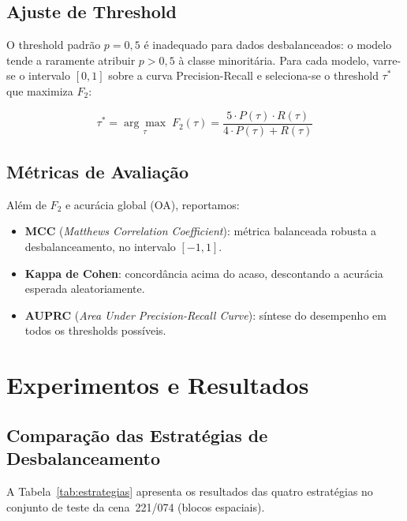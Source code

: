 \documentclass[conference]{IEEEtran}
\begin{document}
\subsection{Ajuste de Threshold}

O threshold padrão $p=0{,}5$ é inadequado para dados desbalanceados:
o modelo tende a raramente atribuir $p>0{,}5$ à classe minoritária.
Para cada modelo, varre-se o intervalo $[0,1]$ sobre a curva
Precision-Recall e seleciona-se o threshold $\tau^*$ que maximiza
$F_2$:

\begin{equation}
  \tau^* = \underset{\tau}{\arg\max}\;
  F_2(\tau) = \frac{5 \cdot P(\tau) \cdot R(\tau)}
                   {4 \cdot P(\tau) + R(\tau)}
  \label{eq:f2}
\end{equation}

\subsection{Métricas de Avaliação}

Além de $F_2$ e acurácia global (OA), reportamos:

\begin{itemize}
  \item \textbf{MCC} (\textit{Matthews Correlation Coefficient}): métrica
        balanceada robusta a desbalanceamento, no intervalo $[-1, 1]$.
  \item \textbf{Kappa de Cohen}: concordância acima do acaso, descontando
        a acurácia esperada aleatoriamente.
  \item \textbf{AUPRC} (\textit{Area Under Precision-Recall Curve}):
        síntese do desempenho em todos os thresholds possíveis.
\end{itemize}

\section{Experimentos e Resultados}

\subsection{Comparação das Estratégias de Desbalanceamento}

A Tabela~\ref{tab:estrategias} apresenta os resultados das quatro estratégias
no conjunto de teste da cena~221/074 (blocos espaciais).
\end{document}
